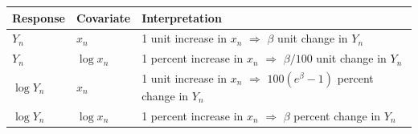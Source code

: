 \documentclass[12pt,oneside,openany]{book}
\begin{document}
\begin{longtable}[]{@{}lll@{}}
\toprule
\begin{minipage}[b]{0.11\columnwidth}\raggedright\strut
Response\strut
\end{minipage} & \begin{minipage}[b]{0.13\columnwidth}\raggedright\strut
Covariate\strut
\end{minipage} & \begin{minipage}[b]{0.19\columnwidth}\raggedright\strut
Interpretation\strut
\end{minipage}\tabularnewline
\midrule
\endhead
\begin{minipage}[t]{0.11\columnwidth}\raggedright\strut
\(Y_n\)\strut
\end{minipage} & \begin{minipage}[t]{0.13\columnwidth}\raggedright\strut
\(x_n\)\strut
\end{minipage} & \begin{minipage}[t]{0.19\columnwidth}\raggedright\strut
1 unit increase in \(x_n\) \(\Rightarrow\) \(\beta\) unit change in
\(Y_n\)\strut
\end{minipage}\tabularnewline
\begin{minipage}[t]{0.11\columnwidth}\raggedright\strut
\(Y_n\)\strut
\end{minipage} & \begin{minipage}[t]{0.13\columnwidth}\raggedright\strut
\(\log x_n\)\strut
\end{minipage} & \begin{minipage}[t]{0.19\columnwidth}\raggedright\strut
1 percent increase in \(x_n\) \(\Rightarrow\) \(\beta / 100\) unit
change in \(Y_n\)\strut
\end{minipage}\tabularnewline
\begin{minipage}[t]{0.11\columnwidth}\raggedright\strut
\(\log Y_n\)\strut
\end{minipage} & \begin{minipage}[t]{0.13\columnwidth}\raggedright\strut
\(x_n\)\strut
\end{minipage} & \begin{minipage}[t]{0.19\columnwidth}\raggedright\strut
1 unit increase in \(x_n\) \(\Rightarrow\) \(100(e^\beta - 1)\) percent
change in \(Y_n\)\strut
\end{minipage}\tabularnewline
\begin{minipage}[t]{0.11\columnwidth}\raggedright\strut
\(\log Y_n\)\strut
\end{minipage} & \begin{minipage}[t]{0.13\columnwidth}\raggedright\strut
\(\log x_n\)\strut
\end{minipage} & \begin{minipage}[t]{0.19\columnwidth}\raggedright\strut
1 percent increase in \(x_n\) \(\Rightarrow\) \(\beta\) percent change
in \(Y_n\)\strut
\end{minipage}\tabularnewline
\bottomrule
\end{longtable}
\end{document}

